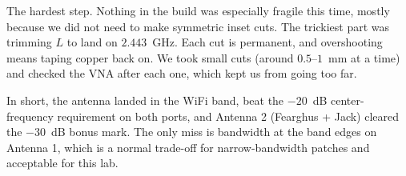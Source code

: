\documentclass[11pt,letterpaper]{article}
\begin{document}
The hardest step. Nothing in the build was especially fragile this time, mostly because we did not need to make symmetric inset cuts. The trickiest part was trimming $L$ to land on $2.443$~GHz. Each cut is permanent, and overshooting means taping copper back on. We took small cuts (around $0.5$--$1$~mm at a time) and checked the VNA after each one, which kept us from going too far.

In short, the antenna landed in the WiFi band, beat the $-20$~dB center-frequency requirement on both ports, and Antenna 2 (Fearghus + Jack) cleared the $-30$~dB bonus mark. The only miss is bandwidth at the band edges on Antenna 1, which is a normal trade-off for narrow-bandwidth patches and acceptable for this lab.
\end{document}
